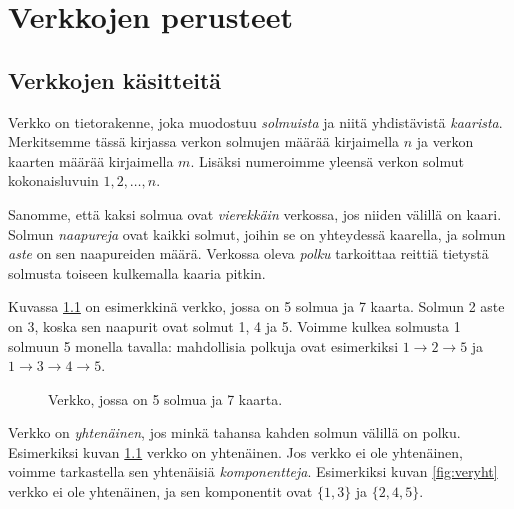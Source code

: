 \chapter{Verkkojen perusteet}

\section{Verkkojen käsitteitä}

Verkko on tietorakenne, joka muodostuu \emph{solmuista} ja
niitä yhdistävistä \emph{kaarista}.
Merkitsemme tässä kirjassa verkon solmujen
määrää kirjaimella $n$ ja verkon kaarten määrää
kirjaimella $m$.
Lisäksi numeroimme yleensä verkon solmut kokonaisluvuin
$1,2,\dots,n$.

Sanomme, että kaksi solmua ovat \emph{vierekkäin} verkossa,
jos niiden välillä on kaari.
Solmun \emph{naapureja} ovat kaikki solmut,
joihin se on yhteydessä kaarella,
ja solmun \emph{aste} on sen naapureiden määrä.
Verkossa oleva \emph{polku} tarkoittaa reittiä
tietystä solmusta toiseen kulkemalla kaaria pitkin.

Kuvassa \ref{fig:veresi} on esimerkkinä verkko,
jossa on 5 solmua ja 7 kaarta.
Solmun 2 aste on 3,
koska sen naapurit ovat solmut 1, 4 ja 5.
Voimme kulkea solmusta 1 solmuun 5 monella tavalla:
mahdollisia polkuja ovat esimerkiksi
$1 \rightarrow 2 \rightarrow 5$ ja
$1 \rightarrow 3 \rightarrow 4 \rightarrow 5$.

\begin{figure}
\center
\begin{center}
\end{center}
\caption{Verkko, jossa on 5 solmua ja 7 kaarta.}
\label{fig:veresi}
\end{figure}

Verkko on \emph{yhtenäinen}, jos minkä tahansa
kahden solmun välillä on polku.
Esimerkiksi kuvan \ref{fig:veresi} verkko on yhtenäinen.
Jos verkko ei ole yhtenäinen, voimme tarkastella
sen yhtenäisiä \emph{komponentteja}.
Esimerkiksi kuvan \ref{fig:veryht} verkko ei ole yhtenäinen,
ja sen komponentit ovat $\{1,3\}$ ja $\{2,4,5\}$.

